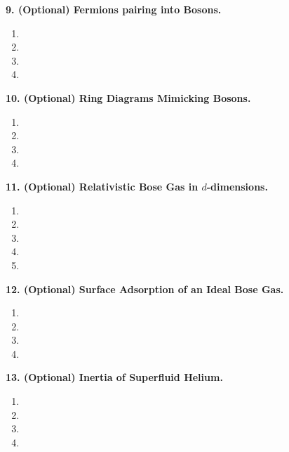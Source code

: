 \documentclass{article}
\theoremstyle{definition}
\begin{document}
\noindent \textbf{9. (Optional) Fermions pairing into Bosons.}

\begin{enumerate}[label=(\alph*)]
	\item 
	
	\item 
	
	\item 
	
	\item 
	
\end{enumerate}


\noindent \textbf{10. (Optional) Ring Diagrams Mimicking Bosons.}

\begin{enumerate}[label=(\alph*)]
	\item 
	
	\item 
	
	\item 
	
	\item 

\end{enumerate}



\noindent \textbf{11. (Optional) Relativistic Bose Gas in $d$-dimensions.}

\begin{enumerate}[label=(\alph*)]
	\item 
	
	\item 
	
	\item 
	
	\item 
	
	\item 
\end{enumerate}



\noindent \textbf{12. (Optional) Surface Adsorption of an Ideal Bose Gas.}

\begin{enumerate}[label=(\alph*)]
	\item 
	
	\item 
	
	\item 
	
	\item 
	
\end{enumerate}



\noindent \textbf{13. (Optional) Inertia of Superfluid Helium.}

\begin{enumerate}[label=(\alph*)]
	\item 
	
	\item 
	
	\item 
	
	\item 
	
\end{enumerate}

	
\end{document}

